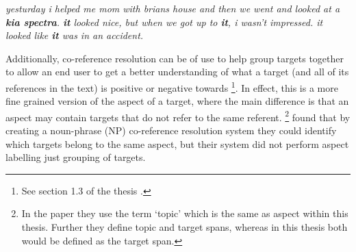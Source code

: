 \begin{example}
\textit{yesturday i helped me mom with brians house and then we went and looked at a \textbf{kia spectra}. \textbf{it} looked nice, but when we got up to \textbf{it}, i wasn't impressed. it looked like \textbf{it} was in an accident.}
\caption{Multiple sentences taken from review car-001-027 from batch 1 of the JDPA car corpus \citep{kessler2010icwsm}. All the bold pronouns represent the same target, which is the kia spectra.}
\label{example:lit_review_discourse_fine_grained_co_ref}
\end{example}

Additionally, co-reference resolution can be of use to help group targets together to allow an end user to get a better understanding of what a target (and all of its references in the text) is positive or negative towards \citep{marasovic2020deep}\footnote{See section 1.3 of the thesis \citep{marasovic2020deep}.}. In effect, this is a more fine grained version of the aspect of a target, where the main difference is that an aspect may contain targets that do not refer to the same referent. \citet{stoyanov-cardie-2008-topic}\footnote{In the paper they use the term `topic' which is the same as aspect within this thesis. Further they define topic and target spans, whereas in this thesis both would be defined as the target span.} found that by creating a noun-phrase (NP) co-reference resolution system they could identify which targets belong to the same aspect, but their system did not perform aspect labelling just grouping of targets.


